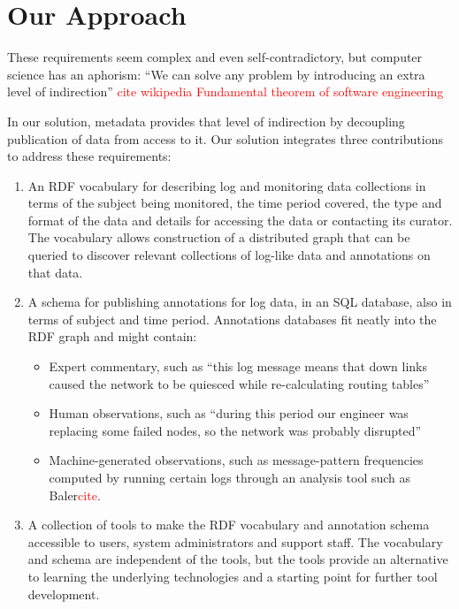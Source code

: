 \section{Our Approach}
\label{s:solution}

These requirements seem complex and even self-contradictory, but
computer science has an aphorism: ``We can solve any problem by
introducing an extra level of indirection''
 \textcolor{red}{cite wikipedia Fundamental theorem of software engineering}

In our solution, metadata provides that level of indirection by 
decoupling publication of data from access to it. Our solution 
integrates three contributions to address these requirements:

\begin{enumerate}
\item An RDF vocabulary for describing log and monitoring data collections
      in terms of the subject being monitored, the time period covered,
      the type and format of the data and details for accessing the data or
      contacting its curator. The vocabulary allows construction of a 
      distributed graph that can be queried to discover relevant collections
      of log-like data and annotations on that data.
      
\item A schema for publishing annotations for log data, in an SQL
	  database, also in terms of subject and time period. Annotations 
      databases fit neatly into the RDF graph and might contain:
      
\begin{itemize}
\item Expert commentary, such as ``this log message means that down links
      caused the network to be quiesced while re-calculating routing tables''      
\item Human observations, such as ``during this period our engineer was 
      replacing some failed nodes, so the network was probably disrupted'' 
\item Machine-generated observations, such as message-pattern frequencies 
      computed by running certain logs through an analysis tool such as 
      Baler\textcolor{red}{cite}.
\end{itemize}

\item A collection of tools to make the RDF vocabulary and annotation 
      schema accessible to users, system administrators and support staff.
      The vocabulary and schema are independent of the tools, but 
      the tools provide an alternative to learning the underlying 
      technologies and a starting point for further tool development.

\end{enumerate}









